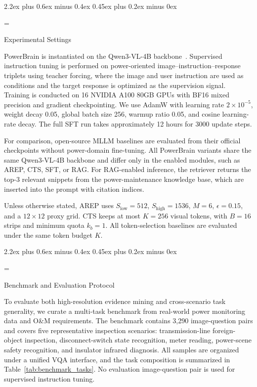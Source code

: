 \documentclass[journal,twoside,web]{ieeecolor}
\makeatletter
\renewcommand{\subsection}{\@startsection{subsection}{2}{\z@}%
  {2.2ex plus 0.6ex minus 0.4ex}%
  {0.45ex plus 0.2ex minus 0ex}%
  {\color{myorange}\normalsize\normalfont\everymath={\sf}\sf\itshape\raggedright}}
\makeatother
\begin{document}
\subsection{Experimental Settings}
\label{sec:exp_settings}

PowerBrain is instantiated on the Qwen3-VL-4B backbone~\cite{qwen3}. Supervised instruction tuning is performed on power-oriented image--instruction--response triplets using teacher forcing, where the image and user instruction are used as conditions and the target response is optimized as the supervision signal. Training is conducted on 16 NVIDIA A100 80GB GPUs with BF16 mixed precision and gradient checkpointing. We use AdamW with learning rate $2\times10^{-5}$, weight decay 0.05, global batch size 256, warmup ratio 0.05, and cosine learning-rate decay. The full SFT run takes approximately 12 hours for 3000 update steps.

For comparison, open-source MLLM baselines are evaluated from their official checkpoints without power-domain fine-tuning. All PowerBrain variants share the same Qwen3-VL-4B backbone and differ only in the enabled modules, such as AREP, CTS, SFT, or RAG. For RAG-enabled inference, the retriever returns the top-3 relevant snippets from the power-maintenance knowledge base, which are inserted into the prompt with citation indices.

Unless otherwise stated, AREP uses $S_{\mathrm{low}}=512$, $S_{\mathrm{high}}=1536$, $M=6$, $\epsilon=0.15$, and a $12\times12$ proxy grid. CTS keeps at most $K=256$ visual tokens, with $B=16$ strips and minimum quota $k_b=1$. All token-selection baselines are evaluated under the same token budget $K$.

\subsection{Benchmark and Evaluation Protocol}
\label{sec:benchmark_protocol}

To evaluate both high-resolution evidence mining and cross-scenario task generality, we curate a multi-task benchmark from real-world power monitoring data and O\&M requirements. The benchmark contains 3,290 image-question pairs and covers five representative inspection scenarios: transmission-line foreign-object inspection, disconnect-switch state recognition, meter reading, power-scene safety recognition, and insulator infrared diagnosis. All samples are organized under a unified VQA interface, and the task composition is summarized in Table~\ref{tab:benchmark_tasks}. No evaluation image-question pair is used for supervised instruction tuning.
\end{document}
